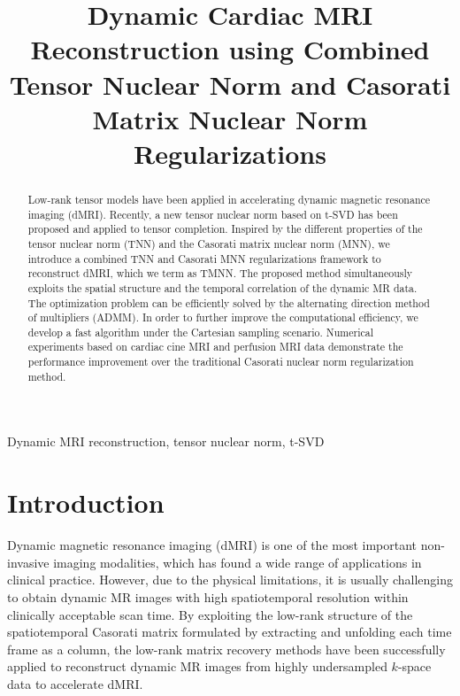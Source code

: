 \documentclass{article}
\title{Dynamic Cardiac MRI Reconstruction using Combined Tensor Nuclear Norm and Casorati Matrix Nuclear Norm Regularizations}
\begin{document}
%
\maketitle

\thispagestyle{fancy}


\renewcommand{\headrulewidth}{0mm}
%
\begin{abstract}
Low-rank tensor models have been applied in accelerating dynamic magnetic resonance imaging (dMRI). Recently, a new tensor nuclear norm based on t-SVD has been proposed and applied to tensor completion. Inspired by the different properties of the tensor nuclear norm (TNN) and the Casorati matrix nuclear norm (MNN), we introduce a combined TNN and Casorati MNN regularizations framework to reconstruct dMRI, which we term as TMNN. The proposed method simultaneously exploits the spatial structure and the temporal correlation of the dynamic MR data. The optimization problem can be efficiently solved by the alternating direction method of multipliers (ADMM). In order to further improve the computational efficiency, we develop a fast algorithm under the Cartesian sampling scenario. Numerical experiments based on cardiac cine MRI and perfusion MRI data demonstrate the performance improvement over the traditional Casorati nuclear norm regularization method.

\end{abstract}
%
\begin{keywords}
Dynamic MRI reconstruction, tensor nuclear norm, t-SVD
\end{keywords}
%
\section{Introduction}
\label{sec:intro}

Dynamic magnetic resonance imaging (dMRI) is one of the most important non-invasive imaging modalities, which has found a wide range of applications in clinical practice. However, due to the physical limitations, it is usually challenging to obtain dynamic MR images with high spatiotemporal resolution within clinically acceptable scan time. 
By exploiting the low-rank structure of the spatiotemporal Casorati matrix formulated by extracting and unfolding each time frame as a column, the low-rank matrix recovery methods \cite{ref_ktslr} have been successfully applied to reconstruct dynamic MR images from highly undersampled $k$-space data to accelerate dMRI. 
\end{document}
